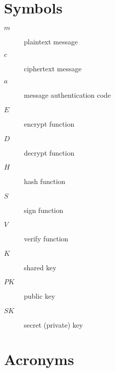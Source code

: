 \chapter{Symbols}

\begin{description}
  \item[$m$] plaintext message
  \item[$c$] ciphertext message
  \item[$a$] message authentication code
  \item[$E$] encrypt function
  \item[$D$] decrypt function
  \item[$H$] hash function
  \item[$S$] sign function
  \item[$V$] verify function
  \item[$K$] shared key
  \item[$PK$] public key
  \item[$SK$] secret (private) key
\end{description}


\chapter{Acronyms}

